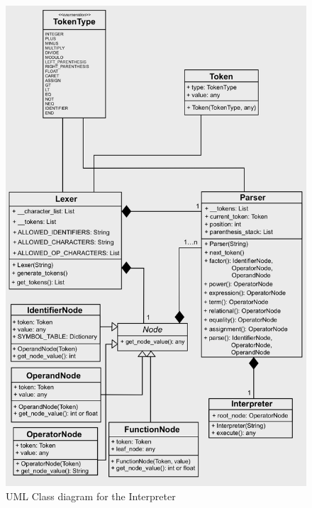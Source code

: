 \documentclass[a4paper, oneside, 11pt]{report}
\begin{document}
\begin{figure}[H]
    \centering
    \includegraphics[width=15cm]{UMLClass1.png}
    \caption{UML Class diagram for the Interpreter}
    \label{fig:UMLClassInterpreter}
\end{figure}

\newpage
\end{document}

